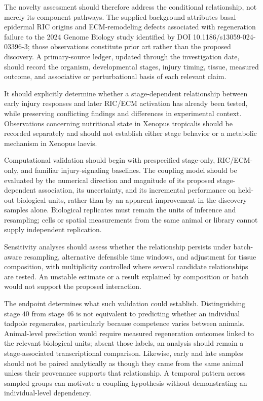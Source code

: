 \documentclass[11pt]{article}
\begin{document}
The novelty assessment should therefore address the conditional relationship, not merely its component pathways. The supplied background attributes basal-epidermal RIC origins and ECM-remodeling defects associated with regeneration failure to the 2024 Genome Biology study identified by DOI 10.1186/s13059-024-03396-3; those observations constitute prior art rather than the proposed discovery. A primary-source ledger, updated through the investigation date, should record the organism, developmental stages, injury timing, tissue, measured outcome, and associative or perturbational basis of each relevant claim.

It should explicitly determine whether a stage-dependent relationship between early injury responses and later RIC/ECM activation has already been tested, while preserving conflicting findings and differences in experimental context. Observations concerning nutritional state in Xenopus tropicalis should be recorded separately and should not establish either stage behavior or a metabolic mechanism in Xenopus laevis.

Computational validation should begin with prespecified stage-only, RIC/ECM-only, and familiar injury-signaling baselines. The coupling model should be evaluated by the numerical direction and magnitude of its proposed stage-dependent association, its uncertainty, and its incremental performance on held-out biological units, rather than by an apparent improvement in the discovery samples alone. Biological replicates must remain the units of inference and resampling; cells or spatial measurements from the same animal or library cannot supply independent replication.

Sensitivity analyses should assess whether the relationship persists under batch-aware resampling, alternative defensible time windows, and adjustment for tissue composition, with multiplicity controlled where several candidate relationships are tested. An unstable estimate or a result explained by composition or batch would not support the proposed interaction.

The endpoint determines what such validation could establish. Distinguishing stage $40$ from stage $46$ is not equivalent to predicting whether an individual tadpole regenerates, particularly because competence varies between animals. Animal-level prediction would require measured regeneration outcomes linked to the relevant biological units; absent those labels, an analysis should remain a stage-associated transcriptional comparison. Likewise, early and late samples should not be paired analytically as though they came from the same animal unless their provenance supports that relationship. A temporal pattern across sampled groups can motivate a coupling hypothesis without demonstrating an individual-level dependency.
\end{document}
